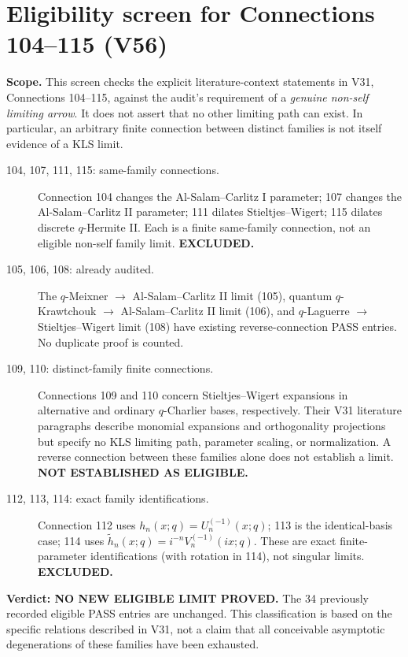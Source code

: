 \documentclass[11pt]{article}
\begin{document}
\section{Eligibility screen for Connections 104--115 (V56)}
\noindent\textbf{Scope.} This screen checks the explicit literature-context statements in V31, Connections 104--115, against the audit's requirement of a \emph{genuine non-self limiting arrow}. It does not assert that no other limiting path can exist. In particular, an arbitrary finite connection between distinct families is not itself evidence of a KLS limit.
\begin{description}
\item[104, 107, 111, 115: same-family connections.] Connection 104 changes the Al-Salam--Carlitz I parameter; 107 changes the Al-Salam--Carlitz II parameter; 111 dilates Stieltjes--Wigert; 115 dilates discrete $q$-Hermite II. Each is a finite same-family connection, not an eligible non-self family limit. \textbf{EXCLUDED.}
\item[105, 106, 108: already audited.] The $q$-Meixner $\to$ Al-Salam--Carlitz II limit (105), quantum $q$-Krawtchouk $\to$ Al-Salam--Carlitz II limit (106), and $q$-Laguerre $\to$ Stieltjes--Wigert limit (108) have existing reverse-connection PASS entries. No duplicate proof is counted.
\item[109, 110: distinct-family finite connections.] Connections 109 and 110 concern Stieltjes--Wigert expansions in alternative and ordinary $q$-Charlier bases, respectively. Their V31 literature paragraphs describe monomial expansions and orthogonality projections but specify no KLS limiting path, parameter scaling, or normalization. A reverse connection between these families alone does not establish a limit. \textbf{NOT ESTABLISHED AS ELIGIBLE.}
\item[112, 113, 114: exact family identifications.] Connection 112 uses $h_n(x;q)=U_n^{(-1)}(x;q)$; 113 is the identical-basis case; 114 uses $\widetilde h_n(x;q)=i^{-n}V_n^{(-1)}(ix;q)$. These are exact finite-parameter identifications (with rotation in 114), not singular limits. \textbf{EXCLUDED.}
\end{description}
\noindent\textbf{Verdict: NO NEW ELIGIBLE LIMIT PROVED.} The 34 previously recorded eligible PASS entries are unchanged. This classification is based on the specific relations described in V31, not a claim that all conceivable asymptotic degenerations of these families have been exhausted.
\end{document}
